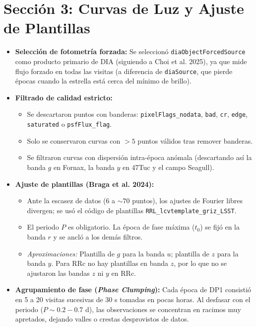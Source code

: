 \documentclass[11pt,a4paper]{article}
\begin{document}
\section{Sección 3: Curvas de Luz y Ajuste de Plantillas}
\begin{itemize}
    \item \textbf{Selección de fotometría forzada:} Se seleccionó \texttt{diaObjectForcedSource} como producto primario de DIA (siguiendo a Choi et al. 2025), ya que mide flujo forzado en todas las visitas (a diferencia de \texttt{diaSource}, que pierde épocas cuando la estrella está cerca del mínimo de brillo).
    \item \textbf{Filtrado de calidad estricto:}
    \begin{itemize}
        \item Se descartaron puntos con banderas: \texttt{pixelFlags\_nodata}, \texttt{bad}, \texttt{cr}, \texttt{edge}, \texttt{saturated} o \texttt{psfFlux\_flag}.
        \item Solo se conservaron curvas con $>5$ puntos válidos tras remover banderas.
        \item Se filtraron curvas con dispersión intra-época anómala (descartando así la banda $g$ en Fornax, la banda $y$ en 47Tuc y el campo Seagull).
    \end{itemize}
    \item \textbf{Ajuste de plantillas (Braga et al. 2024):}
    \begin{itemize}
        \item Ante la escasez de datos ($6$ a $\sim70$ puntos), los ajustes de Fourier libres divergen; se usó el código de plantillas \texttt{RRL\_lcvtemplate\_griz\_LSST}.
        \item El periodo $P$ es obligatorio. La época de fase máxima ($t_0$) se fijó en la banda $r$ y se ancló a los demás filtros.
        \item \textit{Aproximaciones:} Plantilla de $g$ para la banda $u$; plantilla de $z$ para la banda $y$. Para RRc no hay plantillas en banda $z$, por lo que no se ajustaron las bandas $z$ ni $y$ en RRc.
    \end{itemize}
    \item \textbf{Agrupamiento de fase (\textit{Phase Clumping}):} Cada época de DP1 consistió en 5 a 20 visitas sucesivas de 30 s tomadas en pocas horas. Al desfasar con el periodo ($P \sim 0.2 - 0.7$ d), las observaciones se concentran en racimos muy apretados, dejando valles o crestas desprovistos de datos.
\end{itemize}
\end{document}
